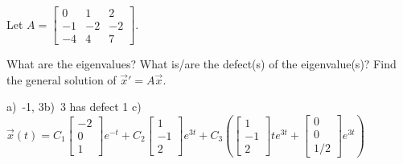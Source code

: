 \begin{exercise}
Let
$A = \left[ \begin{smallmatrix}
0 & 1 & 2 \\
-1 & -2 & -2 \\
-4 & 4 & 7
\end{smallmatrix} \right]$.
\begin{tasks}
\task What are the eigenvalues?
\task What is/are the defect(s) of the eigenvalue(s)?
\task Find the general solution of ${\vec{x}}' = A \vec{x}$.
\end{tasks}
\end{exercise}
\comboSol{%
}
{%
a)~-1, 3\quad b)~3 has defect 1 \quad c)~$\vec{x}(t) = C_1\left[\begin{smallmatrix} -2 \\ 0 \\ 1 \end{smallmatrix}\right]e^{-t} + C_2\left[\begin{smallmatrix} 1 \\ -1 \\ 2 \end{smallmatrix}\right]e^{3t} + C_3\left(\left[\begin{smallmatrix} 1 \\ -1 \\ 2 \end{smallmatrix}\right]te^{3t} + \left[\begin{smallmatrix} 0 \\ 0 \\ 1/2 \end{smallmatrix}\right]e^{3t}\right)$
}

